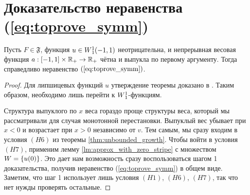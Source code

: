\section{Доказательство неравенства (\ref{eq:toprove_symm})}

\begin{thm}
Пусть $F \in \mathfrak{F}$, функция $u \in W{}_1^1(-1, 1)$ неотрицательна,
и непрерывная весовая функция $a: [-1, 1] \times \mathbb R_+ \to \mathbb R_+$ чётна и выпукла по первому аргументу.
Тогда справедливо неравенство $(\ref{eq:toprove_symm})$.
\end{thm}

\begin{proof}
Для липшицевых функций $u$ утверждение теоремы доказано в \cite{Brock}.
Таким образом, необходимо лишь перейти к $W{}_1^1$-функциям.

Структура выпуклого по $x$ веса гораздо проще структуры веса,
который мы рассматривали для случая монотонной перестановки.
Выпуклый вес убывает при $x < 0$ и возрастает при $x > 0$ независимо от $v$.
Тем самым, мы сразу входим в условия $(H6)$ из теоремы \ref{thm:unbounded_growth}.
Чтобы войти в условия $(H7)$, применим лемму \ref{lm:approx_with_zero_stripe} с множеством $W = \{u(0)\}$.
Это дает нам возможность сразу воспользоваться шагом 1 доказательства,
получив неравенство (\ref{eq:toprove_symm}) в общем виде.
Заметим, что шаг 1 использует лишь условия $(H1)$, $(H6)$, $(H7)$, так что нет нужды проверять остальные.
\end{proof}
